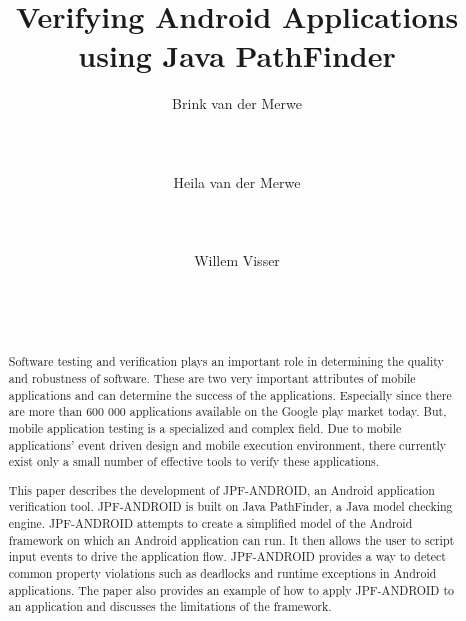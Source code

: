 \documentclass{acm_proc_article-sp}
\begin{document}
\title{Verifying Android Applications using Java PathFinder}


\author{%
\alignauthor  Brink van der Merwe\\
 \\
       \\
       \\
\alignauthor Heila van der Merwe\\
       \\
       \\
       \\
\alignauthor  Willem Visser\\
 \\
       \\
       \\
}

\maketitle

\begin{abstract}
Software testing and verification plays an important role in determining the quality and robustness of software. These are two very important attributes of 
mobile applications and can determine the success of the applications. Especially since there are more than 600 000 applications available on the Google play
market today. But, mobile application testing is a specialized and complex field. Due to mobile applications' event driven design and mobile execution environment,
there currently exist only a small number of 
effective tools to verify these applications.

This paper describes the development of JPF-ANDROID, an Android application verification tool. JPF-ANDROID is built on Java PathFinder, 
a Java model checking engine. JPF-ANDROID attempts to create a simplified model of the Android framework on which an Android application can run. It then allows
the user to script input events to drive the application flow. JPF-ANDROID provides a way to detect common property violations such as deadlocks and runtime exceptions
in Android applications. The paper also provides an example of how to apply JPF-ANDROID to an application and discusses the limitations of the framework.
\end{abstract}
\end{document}
